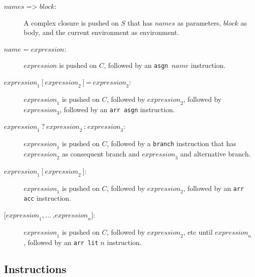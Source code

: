 \begin{description}
\item[$\textit{names} \texttt{ => } \textit{block}$:]
A complex closure is pushed on $S$ that has 
$\textit{names}$ as parameters, 
$\textit{block}$ as body, and the current environment as environment.

\item[$\textit{name} \texttt{ = } \textit{expression}$:]
$\textit{expression}$ is pushed on $C$, followed by
an \texttt{asgn}\ $\textit{name}$ instruction.

\item[$\textit{expression}_1\ \texttt{[}\ \textit{expression}_2\ \texttt{]}\ \texttt{=}\ \textit{expression}_3$:]
$\textit{expression}_1$ is pushed on $C$, followed by
$\textit{expression}_2$, followed by
$\textit{expression}_3$, followed by
an \texttt{arr asgn} instruction.

\item[$\textit{expression}_1\ \texttt{?}\ \textit{expression}_2\ \texttt{:}\
\textit{expression}_3$:]
$\textit{expression}_1$  is pushed on $C$, followed by
a \texttt{branch} instruction that has  $\textit{expression}_2$ as
consequent branch and $\textit{expression}_3$ and alternative branch.

\item[$\textit{expression}_1\ \texttt{[}\ \textit{expression}_2\ \texttt{]}$:]
$\textit{expression}_1$ is pushed on $C$, followed by
$\textit{expression}_2$, followed by an
\texttt{arr acc} instruction.

\item[$\texttt{[}\textit{expression}_1\texttt{,}\ \ldots\ \texttt{,} \textit{expression}_n \texttt{]}$:]
$\textit{expression}_1$ is pushed on $C$, followed by
$\textit{expression}_2$, etc until
$\textit{expression}_n$, followed by an \texttt{arr lit} $n$ instruction.

\end{description}

\subsection*{Instructions}

